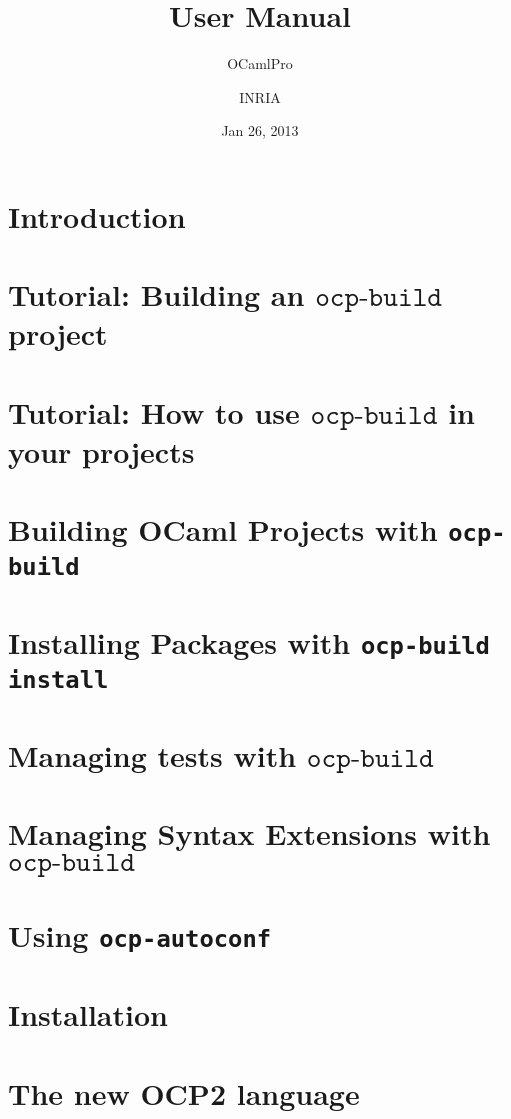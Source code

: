 \documentclass[11pt]{book}
\title{\ocpbuild{} User Manual}
\author{OCamlPro \and INRIA}
\date{Jan 26, 2013}
\newcommand{\cmd}[1]{$\texttt{#1}$}
\newcommand{\ocpbuild}{\cmd{ocp-build}}
\begin{document}
\maketitle
\thispagestyle{empty}
\tableofcontents

\chapter{Introduction}


\chapter{Tutorial: Building an \ocpbuild{} project}


\chapter{Tutorial: How to use \ocpbuild{} in your projects}


\chapter{Building OCaml Projects with {\tt ocp-build}}


\chapter{Installing Packages with {\tt ocp-build install}}


\chapter{Managing tests with \ocpbuild{}}


\chapter{Managing Syntax Extensions with \ocpbuild{}}



\chapter{Using {\tt ocp-autoconf}}


\chapter{Installation}


\chapter{The new OCP2 language}


%
\end{document}
